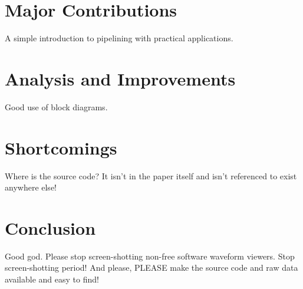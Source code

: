 \documentclass[journal,twocolumn]{IEEEtran}
\begin{document}
\section{Major Contributions}

A simple introduction to pipelining with practical applications.


\section{Analysis and Improvements}

Good use of block diagrams.

\section{Shortcomings}

Where is the source code? It isn't in the paper itself and isn't referenced to
exist anywhere else!

\section{Conclusion}

Good god. Please stop screen-shotting non-free software waveform viewers. Stop 
screen-shotting period! And please, PLEASE make the source code and raw data 
available and easy to find!



\end{document}
